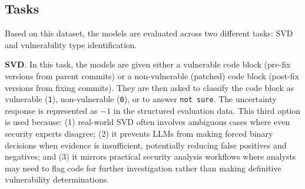 \documentclass[lettersize,journal]{IEEEtran}
\begin{document}
\begin{table}[!t]
\centering
\caption{\gls{CWE} pillar distribution across PBD and LFD.}
\label{table:cwe-pillars-combined}
\small
\renewcommand{\arraystretch}{1.1}
\end{table}


\subsection{Tasks}
\label{section:tasks}

Based on this dataset, the models are evaluated across two different tasks: \gls{SVD} and vulnerability type identification.

\textbf{\gls{SVD}}. In this task, the models are given either a vulnerable code block (pre-fix versions from parent commits) or a non-vulnerable (patched) code block (post-fix versions from fixing commits). They are then asked to classify the code block as vulnerable (\texttt{1}), non-vulnerable (\texttt{0}), or to answer \texttt{not sure}. The uncertainty response is represented as $-1$ in the structured evaluation data. This third option is used because: (1) real-world \gls{SVD} often involves ambiguous cases where even security experts disagree; (2) it prevents \glspl{LLM} from making forced binary decisions when evidence is insufficient, potentially reducing false positives and negatives; and (3) it mirrors practical security analysis workflows where analysts may need to flag code for further investigation rather than making definitive vulnerability determinations. 
\end{document}
